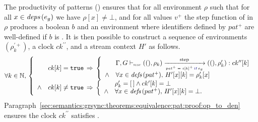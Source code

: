 \begin{skippableproof}
    The productivity of \GRSync patterns ()
    ensures that for all environment $\rho$ such that for all $x \in {\ensuremath{\textit{deps}\left(e_g\right)}}$ we have $\rho[x]
        \neq \bot$, and for all values $v^+$ the step function of  in
    $\rho$ produces a boolean $b$ and an environment where identifiers defined by $pat^+$ are
    well-defined if $b$ is \true.
    It is then possible to construct a sequence of environments $(\rho_k^{\prime+})$, a clock
    $ck^{\prime\prime}$, and a stream context $H'$ as follows.
    \begin{equation*}
        \forall k \in \N, \,
        \left\{
        \begin{array}{ll}
                   & ck[k] = \true \, \Rightarrow \,
            \left\{
            \begin{array}{ll}
                       & \patOpsem{\rho_k}{\guarded{pat^+ = s[k]^+}{e_g}}{ck^{\prime\prime}[k]}{\rho'_k} \\
                \wedge & \forall x \in \defs{pat^+}, \, H'[x][k] = \rho'_k[x]                            \\
            \end{array}
            \right.                                     \\
            \wedge & ck[k] \neq \true \, \Rightarrow \,
            \left\{
            \begin{array}{ll}
                       & \rho'_k = \emptyrho \wedge ck'[k] = \bot         \\
                \wedge & \forall x \in \defs{pat^+}, \,  H'[x][k] = \bot. \\
            \end{array}
            \right.                                     \\
        \end{array}
        \right.
    \end{equation*}
    Paragraph~\ref{sec:semantics:grsync:theorems:equivalence:pat:proof:op_to_den} ensures the clock
    $ck^{\prime\prime}$ satisfies .


\end{skippableproof}
